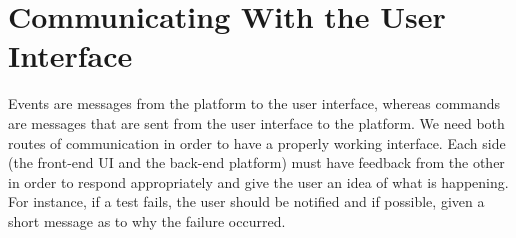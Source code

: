 \documentclass{report}
\begin{document}
	\begin{minipage}{\linewidth}
		\label{fig:test}
	\end{minipage}
	\vspace{5pt}		%

\section{Communicating With the User Interface}
Events are messages from the platform to the user interface, whereas commands are messages that are sent from the user interface to the platform. We need both routes of communication in order to have a properly working interface. Each side (the front-end UI and the back-end platform) must have feedback from the other in order to respond appropriately and give the user an idea of what is happening. For instance, if a test fails, the user should be notified and if possible, given a short message as to why the failure occurred.\\
\end{document}
